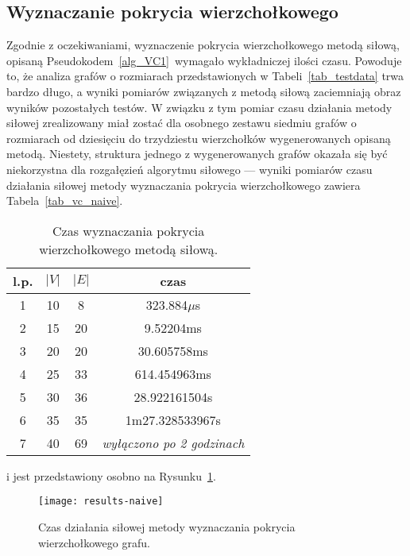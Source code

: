 \subsection{Wyznaczanie pokrycia wierzchołkowego}
\par{
  Zgodnie z oczekiwaniami, wyznaczenie pokrycia wierzchołkowego metodą siłową, opisaną Pseudokodem~\ref{alg_VC1} wymagało wykładniczej ilości czasu.
  Powoduje to, że analiza grafów o rozmiarach przedstawionych w Tabeli~\ref{tab_testdata} trwa bardzo długo, a wyniki pomiarów związanych z metodą siłową zaciemniają obraz wyników pozostałych testów.
  W związku z tym pomiar czasu działania metody siłowej zrealizowany miał zostać dla osobnego zestawu siedmiu grafów o rozmiarach od dziesięciu do trzydziestu wierzchołków wygenerowanych opisaną metodą.
  Niestety, struktura jednego z wygenerowanych grafów okazała się być niekorzystna dla rozgałęzień algorytmu siłowego --- wyniki pomiarów czasu działania siłowej metody wyznaczania pokrycia wierzchołkowego zawiera Tabela~\ref{tab_vc_naive}.
  \begin{table}
    \begin{center}
      \begin{tabular}{| c | c | c | c |}
        \hline
        l.p. & $|V|$ & $|E|$ & czas \\ \hline
        1 & 10 & 8 & 323.884$\mu$s \\
        2 & 15 & 20 & 9.52204ms \\
        3 & 20 & 20 & 30.605758ms \\
        4 & 25 & 33 & 614.454963ms \\
        5 & 30 & 36 & 28.922161504s \\
        6 & 35 & 35 & 1m27.328533967s \\
        7 & 40 & 69 & \textit{wyłączono po 2 godzinach} \\ \hline
      \end{tabular} 
    \end{center}
    \caption{Czas wyznaczania pokrycia wierzchołkowego metodą siłową.}
  \end{table}

   i jest przedstawiony osobno na Rysunku~\ref{fig_results_naive}.
  \begin{figure}
    \caption{Czas działania siłowej metody wyznaczania pokrycia wierzchołkowego grafu.}
    \label{fig_results_naive}
    \centering
      \texttt{[image: results-naive]}
  \end{figure}
}
